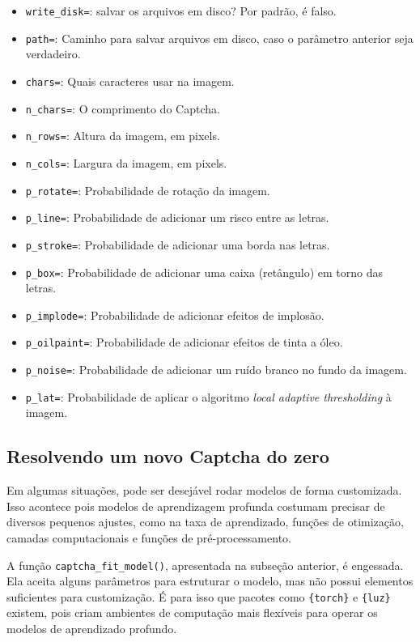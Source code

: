 \documentclass[12pt,twoside,brazilian]{book}
\providecommand{\tightlist}{%
  \setlength{\itemsep}{0pt}\setlength{\parskip}{0pt}}
\begin{document}
\begin{itemize}
\tightlist
\item
  \texttt{write\_disk=}: salvar os arquivos em disco? Por padrão, é
  falso.
\item
  \texttt{path=}: Caminho para salvar arquivos em disco, caso o
  parâmetro anterior seja verdadeiro.
\item
  \texttt{chars=}: Quais caracteres usar na imagem.
\item
  \texttt{n\_chars=}: O comprimento do Captcha.
\item
  \texttt{n\_rows=}: Altura da imagem, em pixels.
\item
  \texttt{n\_cols=}: Largura da imagem, em pixels.
\item
  \texttt{p\_rotate=}: Probabilidade de rotação da imagem.
\item
  \texttt{p\_line=}: Probabilidade de adicionar um risco entre as
  letras.
\item
  \texttt{p\_stroke=}: Probabilidade de adicionar uma borda nas letras.
\item
  \texttt{p\_box=}: Probabilidade de adicionar uma caixa (retângulo) em
  torno das letras.
\item
  \texttt{p\_implode=}: Probabilidade de adicionar efeitos de implosão.
\item
  \texttt{p\_oilpaint=}: Probabilidade de adicionar efeitos de tinta a
  óleo.
\item
  \texttt{p\_noise=}: Probabilidade de adicionar um ruído branco no
  fundo da imagem.
\item
  \texttt{p\_lat=}: Probabilidade de aplicar o algoritmo \emph{local
  adaptive thresholding} à imagem.
\end{itemize}

\hypertarget{sec-captcha-do-zero}{%
\subsection{Resolvendo um novo Captcha do
zero}\label{sec-captcha-do-zero}}

Em algumas situações, pode ser desejável rodar modelos de forma
customizada. Isso acontece pois modelos de aprendizagem profunda
costumam precisar de diversos pequenos ajustes, como na taxa de
aprendizado, funções de otimização, camadas computacionais e funções de
pré-processamento.

A função \texttt{captcha\_fit\_model()}, apresentada na subseção
anterior, é engessada. Ela aceita alguns parâmetros para estruturar o
modelo, mas não possui elementos suficientes para customização. É para
isso que pacotes como \texttt{\{torch\}} e \texttt{\{luz\}} existem,
pois criam ambientes de computação mais flexíveis para operar os modelos
de aprendizado profundo.
\end{document}
